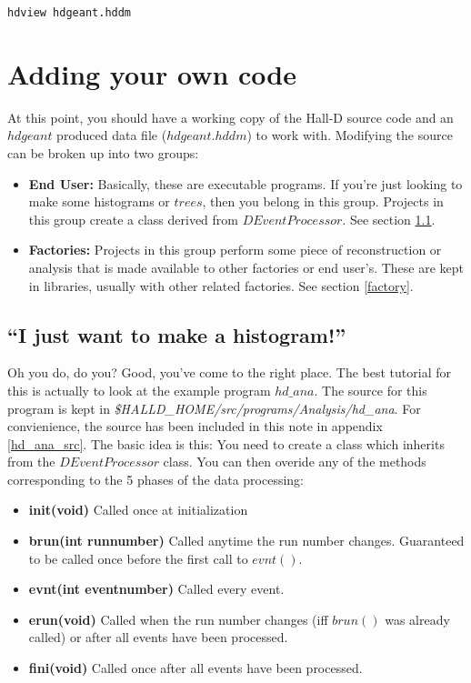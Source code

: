 \documentclass[12pt]{article}
\begin{document}
\begin{lstlisting}[frame=shadowbox,backgroundcolor=\color{cmdbkgd}]
hdview hdgeant.hddm
\end{lstlisting}


\section{Adding your own code}
At this point, you should have a working copy of the Hall-D source 
code and an $hdgeant$ produced data file ($hdgeant.hddm$) to work with.
Modifying the source can be broken up into two groups:
\begin{itemize}
	\item{\bf End User:} Basically, these are executable programs. If
	you're just looking to make some histograms or $trees$, then
	you belong in this group. Projects in this group create a class
	derived from $DEventProcessor$. See section \ref{enduser}.
	
	\item{\bf Factories:} Projects in this group perform some piece
	of reconstruction or analysis that is made available to other
	factories or end user's. These are kept in libraries, usually with
	other related factories. See section \ref{factory}.
\end{itemize}

\subsection{``I just want to make a histogram!''}
\label{enduser}
Oh you do, do you? Good, you've come to the right place. The best
tutorial for this is actually to look at the example program $hd\_ana$. The
source for this program is kept in
{\it \$HALLD\_HOME/src/programs/Analysis/hd\_ana}. For convienience, the
source has been included in this note in appendix \ref{hd_ana_src}.
The basic idea is
this: You need to create a class which inherits from the $DEventProcessor$
class. You can then overide any of the methods corresponding to the 5 phases
of the data processing:

\begin{itemize}
	\item{\bf init(void)} Called once at initialization
	\item{\bf brun(int runnumber)} Called anytime the run number changes.
	 Guaranteed to be called once before the first call to $evnt()$.
	\item{\bf evnt(int eventnumber)} Called every event.
	\item{\bf erun(void)} Called when the run number changes (iff $brun()$
	 was already called) or after all events have been processed.
	\item{\bf fini(void)} Called once after all events have been processed.
\end{itemize}
\end{document}

